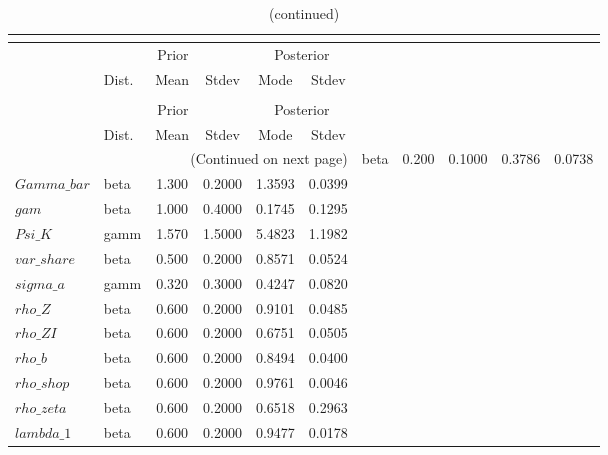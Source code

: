  
\begin{center}
\begin{longtable}{llcccc} 
\caption{Results from posterior maximization (parameters)}\\
 \label{Table:Posterior:1}\\
\toprule 
  & \multicolumn{3}{c}{Prior}  &  \multicolumn{2}{c}{Posterior} \\
  \cmidrule(r{.75em}){2-4} \cmidrule(r{.75em}){5-6}
  & Dist. & Mean  & Stdev & Mode & Stdev \\ 
\midrule \endfirsthead 
\caption{(continued)}\\
 \bottomrule 
  & \multicolumn{3}{c}{Prior}  &  \multicolumn{2}{c}{Posterior} \\
  \cmidrule(r{.75em}){2-4} \cmidrule(r{.75em}){5-6}
  & Dist. & Mean  & Stdev & Mode & Stdev \\ 
\midrule \endhead 
\bottomrule \multicolumn{6}{r}{(Continued on next page)}\endfoot 
\bottomrule\endlastfoot 
$Psi$ & beta &   0.200 & 0.1000 &   0.3786 &  0.0738 \\ 
$Gamma\_bar$ & beta &   1.300 & 0.2000 &   1.3593 &  0.0399 \\ 
$gam$ & beta &   1.000 & 0.4000 &   0.1745 &  0.1295 \\ 
$Psi\_K$ & gamm &   1.570 & 1.5000 &   5.4823 &  1.1982 \\ 
$var\_share$ & beta &   0.500 & 0.2000 &   0.8571 &  0.0524 \\ 
$sigma\_a$ & gamm &   0.320 & 0.3000 &   0.4247 &  0.0820 \\ 
$rho\_Z$ & beta &   0.600 & 0.2000 &   0.9101 &  0.0485 \\ 
$rho\_ZI$ & beta &   0.600 & 0.2000 &   0.6751 &  0.0505 \\ 
$rho\_b$ & beta &   0.600 & 0.2000 &   0.8494 &  0.0400 \\ 
$rho\_shop$ & beta &   0.600 & 0.2000 &   0.9761 &  0.0046 \\ 
$rho\_zeta$ & beta &   0.600 & 0.2000 &   0.6518 &  0.2963 \\ 
$lambda\_1$ & beta &   0.600 & 0.2000 &   0.9477 &  0.0178 \\ 
\end{longtable}
 \end{center}
